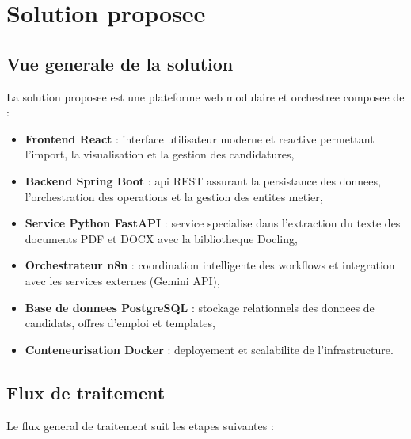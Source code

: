 \section{Solution proposee}

\subsection{Vue generale de la solution}

La solution proposee est une plateforme web modulaire et orchestree composee de :

\begin{itemize}
    \item \textbf{Frontend React} : interface utilisateur moderne et reactive permettant l'import, la visualisation et la gestion des candidatures,
    
    \item \textbf{Backend Spring Boot} : \acrfull{api} REST assurant la persistance des donnees, l'orchestration des operations et la gestion des entites metier,
    
    \item \textbf{Service Python FastAPI} : service specialise dans l'extraction du texte des documents PDF et DOCX avec la bibliotheque Docling,
    
    \item \textbf{Orchestrateur n8n} : coordination intelligente des workflows et integration avec les services externes (Gemini API),
    
    \item \textbf{Base de donnees PostgreSQL} : stockage relationnels des donnees de candidats, offres d'emploi et templates,
    
    \item \textbf{Conteneurisation Docker} : deployement et scalabilite de l'infrastructure.
\end{itemize}

\subsection{Flux de traitement}

Le flux general de traitement suit les etapes suivantes :

